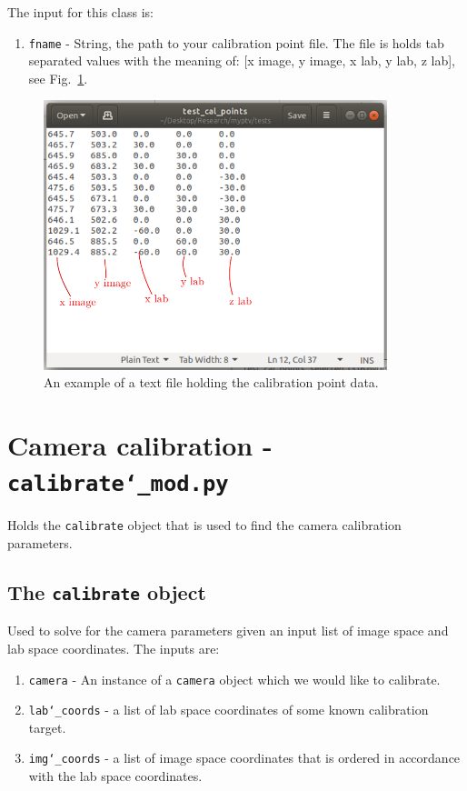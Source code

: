\documentclass[10pt,a4paper]{article}
\begin{document}
The input for this class is:
\begin{enumerate}
	\item \texttt{fname} - String, the path to your calibration point file. The file is holds tab separated values with the meaning of: [x image, y image, x lab, y lab, z lab], see Fig.~\ref{fig:calpointfile}.
\end{enumerate}



\begin{figure}
	\centering
	\includegraphics[width=10cm]{cal_point_file.pdf}
	\caption{An example of a text file holding the calibration point data. \label{fig:calpointfile}}
\end{figure}





\section{Camera calibration - \texttt{calibrate\char`_mod.py}}


Holds the \texttt{calibrate} object that is used to find the camera calibration parameters.



\subsection{The \texttt{calibrate} object}

Used to solve for the camera parameters given an input list of image space and lab space coordinates. The inputs are:

\begin{enumerate}
	\item \texttt{camera} - An instance of a \texttt{camera} object which we would like to calibrate.
	\item \texttt{lab\char`_coords} - a list of lab space coordinates of some known calibration target. 
	\item \texttt{img\char`_coords} - a list of image space coordinates that is ordered in accordance with the lab space coordinates. 
\end{enumerate}
\end{document}
